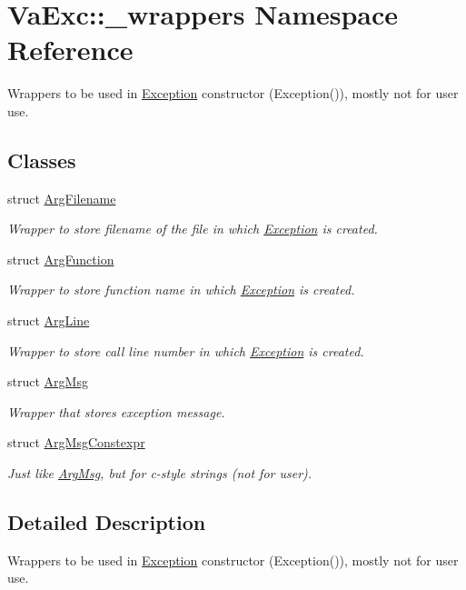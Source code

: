 \hypertarget{namespace_va_exc_1_1__wrappers}{}\section{Va\+Exc\+:\+:\+\_\+wrappers Namespace Reference}
\label{namespace_va_exc_1_1__wrappers}


Wrappers to be used in \hyperlink{class_va_exc_1_1_exception}{Exception} constructor (Exception()), mostly not for user use.  


\subsection*{Classes}
\begin{DoxyCompactItemize}
\item 
struct \hyperlink{struct_va_exc_1_1__wrappers_1_1_arg_filename}{Arg\+Filename}
\begin{DoxyCompactList}\small\item\em Wrapper to store filename of the file in which \hyperlink{class_va_exc_1_1_exception}{Exception} is created. \end{DoxyCompactList}\item 
struct \hyperlink{struct_va_exc_1_1__wrappers_1_1_arg_function}{Arg\+Function}
\begin{DoxyCompactList}\small\item\em Wrapper to store function name in which \hyperlink{class_va_exc_1_1_exception}{Exception} is created. \end{DoxyCompactList}\item 
struct \hyperlink{struct_va_exc_1_1__wrappers_1_1_arg_line}{Arg\+Line}
\begin{DoxyCompactList}\small\item\em Wrapper to store call line number in which \hyperlink{class_va_exc_1_1_exception}{Exception} is created. \end{DoxyCompactList}\item 
struct \hyperlink{struct_va_exc_1_1__wrappers_1_1_arg_msg}{Arg\+Msg}
\begin{DoxyCompactList}\small\item\em Wrapper that stores exception message. \end{DoxyCompactList}\item 
struct \hyperlink{struct_va_exc_1_1__wrappers_1_1_arg_msg_constexpr}{Arg\+Msg\+Constexpr}
\begin{DoxyCompactList}\small\item\em Just like \hyperlink{struct_va_exc_1_1__wrappers_1_1_arg_msg}{Arg\+Msg}, but for c-\/style strings (not for user). \end{DoxyCompactList}\end{DoxyCompactItemize}


\subsection{Detailed Description}
Wrappers to be used in \hyperlink{class_va_exc_1_1_exception}{Exception} constructor (Exception()), mostly not for user use. 